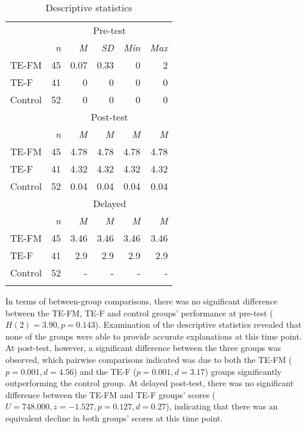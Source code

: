 \documentclass[output=paper]{langscibook}
\begin{document}
\begin{table}
\begin{tabular}{lrrrrr}
\lsptoprule
&  \multicolumn{5}{c}{Pre-test}\\\cmidrule(lr){2-6}
& \textit{n} & \textit{M} & \textit{SD} & \textit{Min} & \textit{Max}\\
\midrule
 TE-FM & 45 & 0.07 & 0.33 & 0 & 2\\
 TE-F & 41 & 0 & 0 & 0 & 0\\
 Control & 52 & 0 & 0 & 0 & 0\\
 \midrule
&  \multicolumn{5}{c}{Post-test}\\\cmidrule(lr){2-6}
& \textit{n} & \textit{M} & \textit{M} & \textit{M} & \textit{M}\\
\midrule
 TE-FM & 45 & 4.78 & 4.78 & 4.78 & 4.78\\
 TE-F & 41 & 4.32 & 4.32 & 4.32 & 4.32\\
 Control & 52 & 0.04 & 0.04 & 0.04 & 0.04\\
 \midrule
& \multicolumn{5}{c}{Delayed}\\\cmidrule(lr){2-6}
& \textit{n} & \textit{M} & \textit{M} & \textit{M} & \textit{M}\\
\midrule
 TE-FM & 45 & 3.46 & 3.46 & 3.46 & 3.46\\
 TE-F & 41 & 2.9 & 2.9 & 2.9 & 2.9\\
 Control & 52 & {}- & {}- & {}- & {}-\\
\lspbottomrule
\end{tabular}
\caption{Descriptive statistics\label{tab:kasprowicz:1}}
\end{table}

In terms of between-group comparisons, there was no significant difference between the TE-FM, TE-F and control groups’ performance at pre-test ($H(2) = 3.90,\allowbreak p = 0.143$). Examination of the descriptive statistics revealed that none of the groups were able to provide accurate explanations at this time point. At post-test, however, a significant difference between the three groups was observed, which pairwise comparisons indicated was due to both the TE-FM ($p = 0.001,\allowbreak d = 4.56$) and the TE-F ($p = 0.001,\allowbreak d = 3.17$) groups significantly outperforming the control group. At delayed post-test, there was no significant difference between the TE-FM and TE-F groups’ scores ($U = 748.000,\allowbreak z = -1.527,\allowbreak p = 0.127,\allowbreak d = 0.27$), indicating that there was an equivalent decline in both groups’ scores at this time point.
\end{document}
